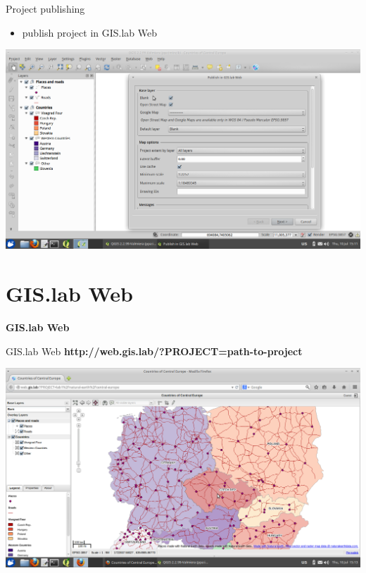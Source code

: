 \documentclass[12pt]{beamer}
\begin{document}
\begin{frame}{Project publishing}
	\begin{itemize}
		\item publish project in GIS.lab Web
	\end{itemize}
	\begin{center}
		\includegraphics[keepaspectratio=true,height=0.6\textheight]{images/rapid-gis-deployment/project-publish.png}
	\end{center}
\end{frame}


\section{GIS.lab Web}
\begin{frame}
	\begin{center}
		\LARGE\textbf{GIS.lab Web}
	\end{center}
\end{frame}


\begin{frame}{GIS.lab Web}
	\textbf{http://web.gis.lab/?PROJECT=path-to-project}
	\begin{center}
		\includegraphics[keepaspectratio=true,height=0.7\textheight]{images/rapid-gis-deployment/project-gislab-web.png}
	\end{center}
\end{frame}
\end{document}
